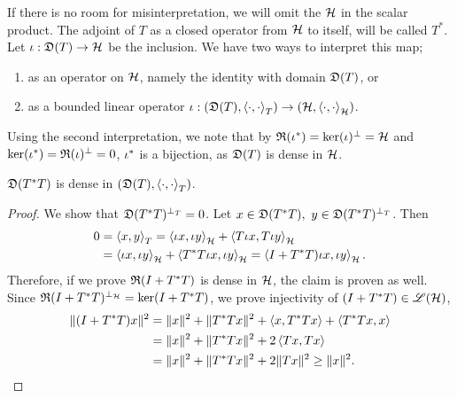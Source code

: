 If there is no room for misinterpretation,
we will omit the $\mathcal{H}$ in the scalar product. The adjoint of $T$ as a closed 
operator from $\mathcal{H}$ to itself, will be called $T^*$. 
Let $\iota : \mathfrak{D}(T) \to \mathcal{H}$ be the inclusion.
We have two ways to interpret this map;
\begin{enumerate}
 \item as an operator on $\mathcal{H}$, namely the identity with domain $\mathfrak{D}(T)$, or
 \item as a bounded linear operator $\iota : ( \mathfrak{D}(T) , \left\langle \cdot, \cdot \right\rangle_T)
 \to ( \mathcal{H} , \left\langle \cdot, \cdot \right\rangle_{\mathcal{H}})$.
\end{enumerate}
Using the second interpretation, we note that by 
$\mathfrak{R}(\iota^{*}) = \ker(\iota)^\perp =\mathcal{H}$
and $\ker(\iota^{*}) = \mathfrak{R}(\iota)^\perp = 0$, $\iota^{*}$ is a bijection,
as $\mathfrak{D}(T)$ is dense in $\mathcal{H}$. 
\begin{lem}\label{TTstrDense}
 $\mathfrak{D}(T^{*} T)$ is dense in $( \mathfrak{D}(T) , \left\langle \cdot, \cdot \right\rangle_T)$.
\end{lem}
\begin{proof}
 We show that $\mathfrak{D}(T ^{*} T)^{\perp_T} = 0$. Let $x \in \mathfrak{D}(T ^{*} T), 
 ~y \in \mathfrak{D}(T ^{*} T)^{\perp_T}$. Then
 \begin{align*}
  0 &=\left\langle x, y \right\rangle_T = \left\langle \iota x, \iota y \right\rangle_{\mathcal{H}} + \left\langle T\iota x, T\iota y \right\rangle
  _{\mathcal{H}} \\
  &=\left\langle \iota x, \iota y \right\rangle_{\mathcal{H}} + \left\langle T^{*} T\iota x, \iota y \right\rangle_{\mathcal{H}}
= \left\langle I + T ^{*} T) \iota x, \iota y \right\rangle_{\mathcal{H}}.
 \end{align*}
Therefore, if we prove $\mathfrak{R}(I + T^{*} T)$ is dense in $\mathcal{H}$, the claim is
proven as well. Since $\mathfrak{R}(I + T^{*} T)^{\perp_{\mathcal{H}}} = \ker(I + T^{*} T)$, we prove
injectivity of $(I + T^{*} T) \in \mathscr{L}(\mathcal{H})$,
\begin{align*}
 \| (I + T^{*} T)x \| ^2  
 &= \|x \| ^2 + \| T ^{*} T x\| ^2 + \left\langle x, T^{*} T x \right\rangle
 + \left\langle T ^{*} T x, x \right\rangle\\
 &=\|x \| ^2 + \| T ^{*} T x\| ^2 + 2\left\langle Tx,  T x \right\rangle \\
 &= \|x \| ^2 + \| T ^{*} T x\| ^2 + 2\|T x\|^2 \geq \|x\|^2.
\end{align*}

\end{proof}


